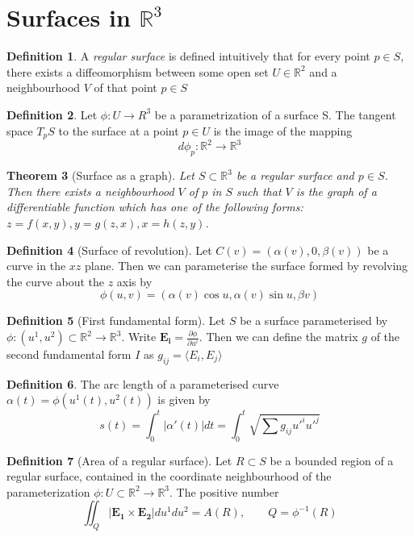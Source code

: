 \documentclass[10pt, oneside, reqno]{amsart}
\newcommand{\R}{\mathbb{R}}
\theoremstyle{plain}%
\newtheorem{thm}{Theorem}[section]
\theoremstyle{definition}
\newtheorem{defn}[thm]{Definition}
\theoremstyle{remark}
\begin{document}
\section{Surfaces in $\R^3$}



\begin{defn}
    A \emph{regular surface} is defined intuitively that for every point $p \in S$, there exists a diffeomorphism between some open set $U \in \R^2$ and a neighbourhood $V$ of that point $p \in S$
\end{defn}

\begin{defn}
    Let $\phi: U \rightarrow R^3$ be a parametrization of a surface S.  The tangent space $T_p S$ to the surface at a point $p \in U$ is the image of the mapping \[
        d\phi_p : \R^2 \rightarrow \R^3
    \]
\end{defn}
\begin{thm}[Surface as a graph]
    Let $S \subset \R^3$ be a regular surface and $p \in S$.  Then there exists a neighbourhood $V$ of $p$ in $S$ such that $V$ is the graph of a differentiable function which has one of the following forms: $z = f(x,y), y = g(z,x), x = h(z,y)$.
\end{thm}


\begin{defn}[Surface of revolution]
    Let $C(v) = (\alpha(v),0,\beta(v))$ be a curve in the $xz$ plane.  Then we can parameterise the surface formed by revolving the curve about the $z$ axis by \[
        \phi(u,v) = (\alpha(v)\cos u, \alpha(v) \sin u,\beta v )
    \]
\end{defn}
\begin{defn}[First fundamental form]
    Let $S$ be a surface parameterised by $\phi : (u^1,u^2) \subset \R^2 \rightarrow \R^3$.  Write $\mathbf{E_i} = \frac{\partial \phi}{\partial u^i}$.  Then we can define the matrix $g$ of the second fundamental form $I$  as $g_{ij} = \langle E_i,E_j \rangle$
\end{defn}

\begin{defn}
    The arc length of a parameterised curve $\alpha(t) = \phi(u^1(t),u^2(t))$ is given by \[
        s(t) = \int_0^t |\alpha'(t)| dt = \int_0^t \sqrt{\sum g_{ij} u'^i u'^j }
            \]
\end{defn}

\begin{defn}[Area of a regular surface]
    Let $R \subset S$ be a bounded region of a regular surface, contained in the coordinate neighbourhood of the parameterization $\phi: U \subset \R^2 \rightarrow \R^3$.  The positive number \[
        \iint_Q |\mathbf{E_1} \times \mathbf{E_2} | du^1 du^2 = A(R), \qquad Q = \phi^{-1}(R) 
    \]
\end{defn}
\end{document}
